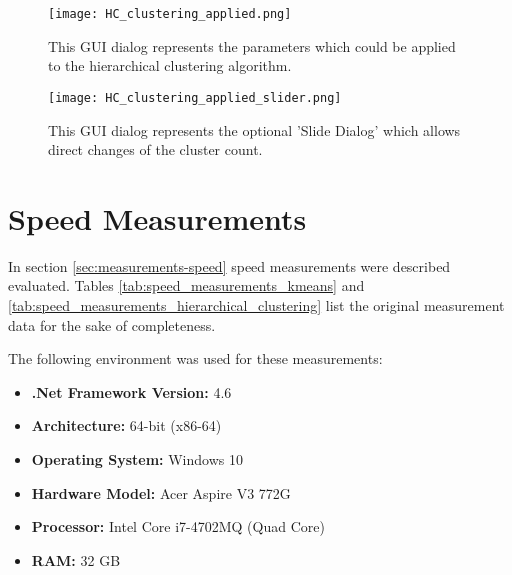 \begin{figure}[ht]
    \centering
    \texttt{[image: HC\_clustering\_applied.png]}
    \caption{This \gls{GUI} dialog represents the parameters which could be applied to the hierarchical clustering algorithm.}
    \label{fig:applied_HC_clustering_GUI}
\end{figure}

\begin{figure}[ht]
    \centering
    \texttt{[image: HC\_clustering\_applied\_slider.png]}
    \caption{This \gls{GUI} dialog represents the optional 'Slide Dialog' which allows direct changes of the cluster count.}
    \label{fig:applied_HC_clustering_slider_GUI}
\end{figure}

\pagebreak
\section{Speed Measurements} \label{sec:speed_measurement_tables}

In section \ref{sec:measurements-speed} speed measurements were described evaluated. Tables \ref{tab:speed_measurements_kmeans} and \ref{tab:speed_measurements_hierarchical_clustering} list the original measurement data for the sake of completeness.

The following environment was used for these measurements:

\begin{itemize}
    \item \textbf{.Net Framework Version:} 4.6
    \item \textbf{Architecture:} 64-bit (x86-64)
    \item \textbf{Operating System:} Windows 10
    \item \textbf{Hardware Model:} Acer Aspire V3 772G
    \item \textbf{Processor:} Intel Core i7-4702MQ (Quad Core)
    \item \textbf{RAM:} 32 GB
\end{itemize}


